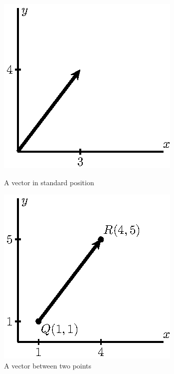 \begin{figure}[ht]
  \begin{center}
    \begin{minipage}{3.0in}
      \begin{center}
        \includegraphics{figures/fig_9_2_std_pos.eps}
      \end{center}
      \caption{A vector in standard position}
      \label{F:9.2.vectors2}
    \end{minipage}
    \begin{minipage}{3.0in}
      \begin{center}
        \includegraphics{figures/fig_9_2_btw_pts.eps}
      \end{center}
      \caption{A vector between two points}
      \label{F:9.2.vectors3}
    \end{minipage}
  \end{center}
\end{figure}

